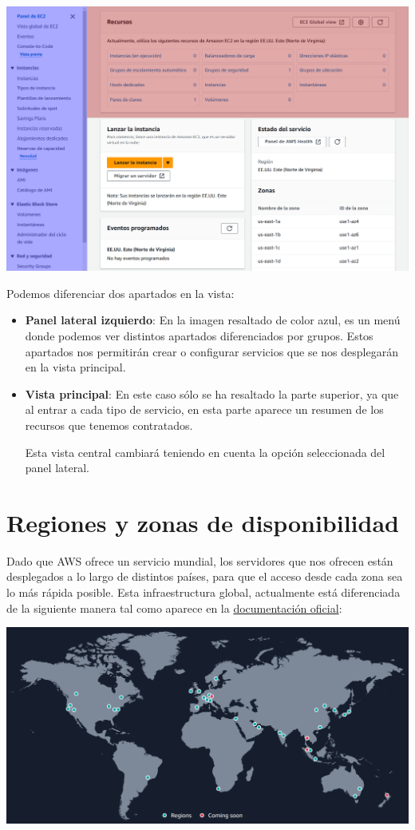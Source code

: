 \begin{center}
	\includegraphics[width=0.8\linewidth]{img/aws/panel.png}
\end{center}

Podemos diferenciar dos apartados en la vista:
\begin{itemize}
	\item \textbf{Panel lateral izquierdo}: En la imagen resaltado de color azul, es un menú donde podemos ver distintos apartados diferenciados por grupos. Estos apartados nos permitirán crear o configurar servicios que se nos desplegarán en la vista principal.
	
	\item \textbf{Vista principal}: En este caso sólo se ha resaltado la parte superior, ya que al entrar a cada tipo de servicio, en esta parte aparece un resumen de los recursos que tenemos contratados.
	
	Esta vista central cambiará teniendo en cuenta la opción seleccionada del panel lateral.
\end{itemize}

\chapter{Regiones y zonas de disponibilidad}

Dado que AWS ofrece un servicio mundial, los servidores que nos ofrecen están desplegados a lo largo de distintos países, para que el acceso desde cada zona sea lo más rápida posible. Esta infraestructura global, actualmente está diferenciada de la siguiente manera tal como aparece en la \href{https://aws.amazon.com/es/about-aws/global-infrastructure/regions_az/?p=ngi&loc=2}{documentación oficial}:

\begin{center}
	\includegraphics[width=0.8\linewidth]{img/aws/regiones.png}
\end{center}

